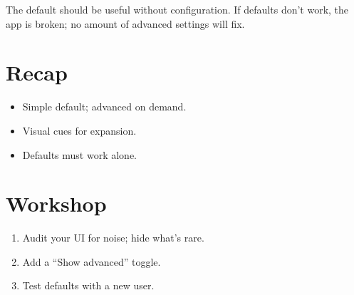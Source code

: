 The default should be useful without configuration. If
defaults don't work, the app is broken; no amount of
advanced settings will fix.

\section{Recap}

\begin{recap}
\begin{itemize}[leftmargin=*]
  \item Simple default; advanced on demand.
  \item Visual cues for expansion.
  \item Defaults must work alone.
\end{itemize}
\end{recap}

\section*{Workshop}

\begin{enumerate}[leftmargin=*]
  \item Audit your UI for noise; hide what's rare.
  \item Add a ``Show advanced'' toggle.
  \item Test defaults with a new user.
\end{enumerate}
